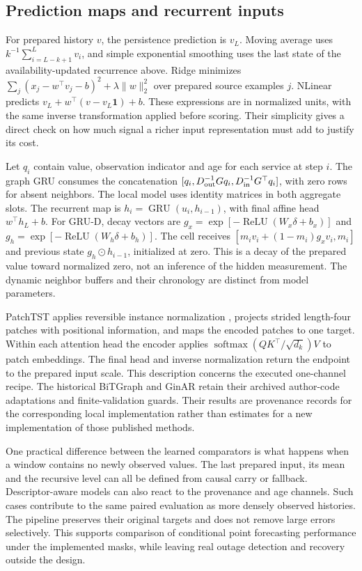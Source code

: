\subsection{Prediction maps and recurrent inputs}
For prepared history $v$, the persistence prediction is $v_L$. Moving average uses $k^{-1}\sum_{i=L-k+1}^L v_i$, and simple exponential smoothing uses the last state of the availability-updated recurrence above. Ridge minimizes $\sum_j(x_j-w^\top v_j-b)^2+\lambda\|w\|_2^2$ over prepared source examples $j$. NLinear predicts $v_L+w^\top(v-v_L\mathbf1)+b$. These expressions are in normalized units, with the same inverse transformation applied before scoring. Their simplicity gives a direct check on how much signal a richer input representation must add to justify its cost.

Let $q_i$ contain value, observation indicator and age for each service at step $i$. The graph GRU consumes the concatenation $[q_i,D_{\rm out}^{-1}Gq_i,D_{\rm in}^{-1}G^\top q_i]$, with zero rows for absent neighbors. The local model uses identity matrices in both aggregate slots. The recurrent map is $h_i=\operatorname{GRU}(u_i,h_{i-1})$, with final affine head $w^\top h_L+b$. For GRU-D, decay vectors are $g_x=\exp[-\operatorname{ReLU}(W_x\delta+b_x)]$ and $g_h=\exp[-\operatorname{ReLU}(W_h\delta+b_h)]$. The cell receives $[m_iv_i+(1-m_i)g_xv_i,m_i]$ and previous state $g_h\odot h_{i-1}$, initialized at zero. This is a decay of the prepared value toward normalized zero, not an inference of the hidden measurement. The dynamic neighbor buffers and their chronology are distinct from model parameters.

PatchTST applies reversible instance normalization \cite{revin}, projects strided length-four patches with positional information, and maps the encoded patches to one target. Within each attention head the encoder applies $\operatorname{softmax}(QK^\top/\sqrt{d_k})V$ to patch embeddings. The final head and inverse normalization return the endpoint to the prepared input scale. This description concerns the executed one-channel recipe. The historical BiTGraph and GinAR retain their archived author-code adaptations and finite-validation guards. Their results are provenance records for the corresponding local implementation rather than estimates for a new implementation of those published methods.

One practical difference between the learned comparators is what happens when a window contains no newly observed values. The last prepared input, its mean and the recursive level can all be defined from causal carry or fallback. Descriptor-aware models can also react to the provenance and age channels. Such cases contribute to the same paired evaluation as more densely observed histories. The pipeline preserves their original targets and does not remove large errors selectively. This supports comparison of conditional point forecasting performance under the implemented masks, while leaving real outage detection and recovery outside the design.
